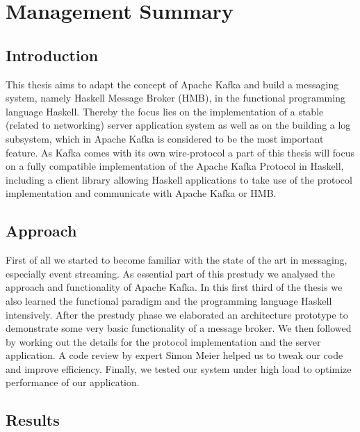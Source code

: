 \chapter{Management Summary}

\section{Introduction}

This thesis aims to adapt the concept of Apache Kafka and build a messaging
system, namely Haskell Message Broker (HMB), in the functional programming
language Haskell. Thereby the focus lies on the implementation of a stable
(related to networking) server application system as well as on the building a
log subsystem, which in Apache Kafka is considered to be the most important
feature. As Kafka comes with its own wire-protocol a part of this thesis will
focus on a fully compatible implementation of the Apache Kafka Protocol in
Haskell, including a client library allowing Haskell applications to take use of
the protocol implementation and communicate with Apache Kafka or HMB.

\section{Approach}

First of all we started to become familiar with the state of the art in
messaging, especially event streaming. As essential part of this prestudy we
analysed the approach and functionality of Apache Kafka. In this first third of
the thesis we also learned the functional paradigm and the programming language
Haskell intensively. After the prestudy phase we elaborated an architecture prototype
to demonstrate some very basic functionality of a message broker. We then
followed by working out the details for the protocol implementation and the
server application. A code review by expert Simon Meier helped us to tweak our
code and improve efficiency. Finally, we tested our system under high load to
optimize performance of our application.

\section{Results}

